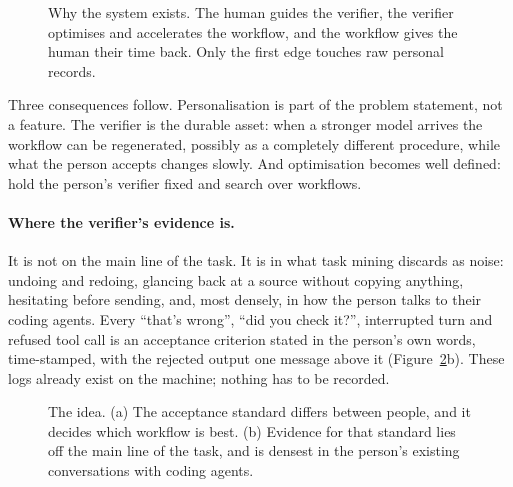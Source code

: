 \documentclass[10pt]{article}
\begin{document}
\begin{figure}[t]
\centering

\caption{Why the system exists. The human guides the verifier, the verifier optimises and accelerates the workflow,
and the workflow gives the human their time back. Only the first edge touches raw personal records.}
\label{fig:triangle}
\end{figure}

Three consequences follow. Personalisation is part of the problem statement, not a feature. The verifier is the
durable asset: when a stronger model arrives the workflow can be regenerated, possibly as a completely different
procedure, while what the person accepts changes slowly. And optimisation becomes well defined: hold the
person's verifier fixed and search over workflows.

\paragraph{Where the verifier's evidence is.} It is not on the main line of the task. It is in what task mining
discards as noise: undoing and redoing, glancing back at a source without copying anything, hesitating before
sending, and, most densely, in how the person talks to their coding agents. Every ``that's wrong'', ``did you
check it?'', interrupted turn and refused tool call is an acceptance criterion stated in the person's own words,
time-stamped, with the rejected output one message above it (Figure~\ref{fig:idea}b). These logs already exist
on the machine; nothing has to be recorded.

\begin{figure}[t]
\centering

\caption{The idea. (a) The acceptance standard differs between people, and it decides which workflow is best.
(b) Evidence for that standard lies off the main line of the task, and is densest in the person's existing
conversations with coding agents.}
\label{fig:idea}
\end{figure}
\end{document}
